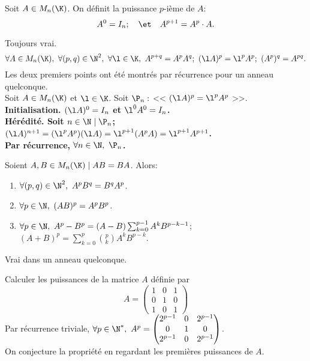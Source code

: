 \documentclass[11pt]{article}
\begin{document}
\begin{defi}{}{}
    Soit $A\in M_n(\K)$. On définit la puissance $p$-ième de $A$:
    \begin{equation*}
        A^0 = I_n; \quad\et\quad A^{p+1} = A^p\cdot A.
    \end{equation*}
\end{defi}

\begin{prop}{Toujours vrai.}{}
    \begin{equation*}
        \forall A \in M_n(\K), ~ \forall (p,q)\in\N^2, ~ \forall \l\in \K, ~ A^{p+q}=A^pA^q; ~ (\l A)^p = \l^pA^p; ~ (A^p)^q=A^{pq}.
    \end{equation*}
    \tcblower
    Les deux premiers points ont été montrés par récurrence pour un anneau quelconque.\\
    Soit $A\in M_{n}(\K)$ et $\l\in \K$. Soit $\P_n:$ << $(\l A)^p = \l^pA^p$ >>.\\
    \bf{Initialisation.} $(\l A)^0=I_n$ et $\l^0A^0=I_n$.\\
    \bf{Hérédité.} Soit $n\in\N\mid \P_n$; $(\l A)^{n+1}=(\l^pA^p)(\l A)=\l^{p+1}(A^pA)=\l^{p+1}A^{p+1}$.\\
    Par récurrence, $\forall n \in \N, ~ \P_n$.
\end{prop}

\begin{prop}{}{}
    Soient $A,B\in M_n(\K)\mid AB=BA$. Alors:
    \begin{enumerate}
        \item $\forall (p,q)\in\N^2, ~ A^pB^q=B^qA^p$.
        \item $\forall p \in \N, ~ (AB)^p=A^pB^p$.
        \item $\forall p \in \N, ~ A^p-B^p=(A-B)\sum_{k=0}^{p-1}A^kB^{p-k-1}$; ~ $(A+B)^p=\sum_{k=0}^p\binom{p}{k}A^kB^{p-k}$.
    \end{enumerate}
    \tcblower
    Vrai dans un anneau quelconque.
 \end{prop}

\begin{ex}{}{}
    Calculer les puissances de la matrice $A$ définie par
    \begin{equation*}
        A=\begin{pmatrix}
            1&0&1\\
            0&1&0\\
            1&0&1
        \end{pmatrix}
    \end{equation*}
    \tcblower
    Par récurrence triviale, $\forall p\in\N^*, ~ A^p=\begin{pmatrix}
        2^{p-1}&0&2^{p-1}\\
        0&1&0\\
        2^{p-1}&0&2^{p-1}
    \end{pmatrix}$.\\
    On conjecture la propriété en regardant les premières puissances de $A$.
\end{ex}
\end{document}

